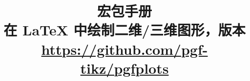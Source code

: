 \documentclass[a4paper,openany]{book}
\title{%
    \PGFPlots{} 宏包手册\\
    {\small 在 \LaTeX{} 中绘制二维/三维图形，版本 \pgfplotsversion}\\
    {\small\url{https://github.com/pgf-tikz/pgfplots}}
}
\let\bookmaketitle=\maketitle
\begin{document}
\def\plotcoords{%
\addplot coordinates {
(5,8.312e-02)    (17,2.547e-02)   (49,7.407e-03)
(129,2.102e-03)  (321,5.874e-04)  (769,1.623e-04)
(1793,4.442e-05) (4097,1.207e-05) (9217,3.261e-06)
};

\addplot coordinates{
(7,8.472e-02)    (31,3.044e-02)    (111,1.022e-02)
(351,3.303e-03)  (1023,1.039e-03)  (2815,3.196e-04)
(7423,9.658e-05) (18943,2.873e-05) (47103,8.437e-06)
};

\addplot coordinates{
(9,7.881e-02)     (49,3.243e-02)    (209,1.232e-02)
(769,4.454e-03)   (2561,1.551e-03)  (7937,5.236e-04)
(23297,1.723e-04) (65537,5.545e-05) (178177,1.751e-05)
};

\addplot coordinates{
(11,6.887e-02)    (71,3.177e-02)     (351,1.341e-02)
(1471,5.334e-03)  (5503,2.027e-03)   (18943,7.415e-04)
(61183,2.628e-04) (187903,9.063e-05) (553983,3.053e-05)
};

\addplot coordinates{
(13,5.755e-02)     (97,2.925e-02)     (545,1.351e-02)
(2561,5.842e-03)   (10625,2.397e-03)  (40193,9.414e-04)
(141569,3.564e-04) (471041,1.308e-04)
(1496065,4.670e-05)
};
}%


\bookmaketitle
\tableofcontents









\printindex

\nocite{pgfplotstable}
\nocite{programmingnotes}

\end{document}
